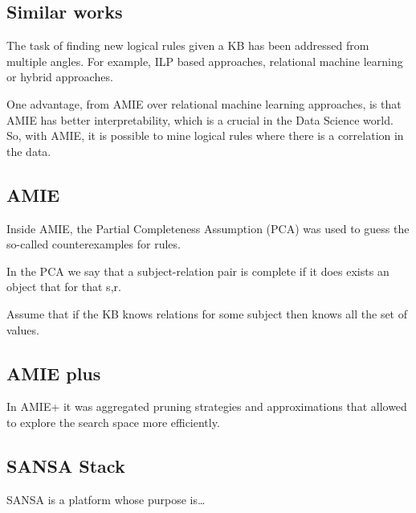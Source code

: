 \documentclass{article}
\begin{document}
\subsection{Similar works}

The task of finding new logical rules given a KB has been addressed from
multiple angles. For example, ILP based approaches, relational machine learning
or hybrid approaches.

One advantage, from AMIE over relational machine learning approaches, is that
AMIE has better interpretability, which is a crucial in the Data Science world.
So, with AMIE, it is possible to mine logical rules where there is a
correlation in the data.

\subsection{AMIE}


Inside AMIE, the Partial Completeness Assumption (PCA) was used to guess the
so-called counterexamples for rules.

In the PCA we say that a subject-relation pair is complete if it does exists
an object that for that s,r.

Assume that if the KB knows relations for some subject then knows all the set
of values.



\subsection{AMIE plus}

In AMIE+ it was aggregated pruning strategies and approximations that allowed
to explore the search space more efficiently.

\subsection{SANSA Stack}

SANSA is a platform whose purpose is\ldots



\end{document}
